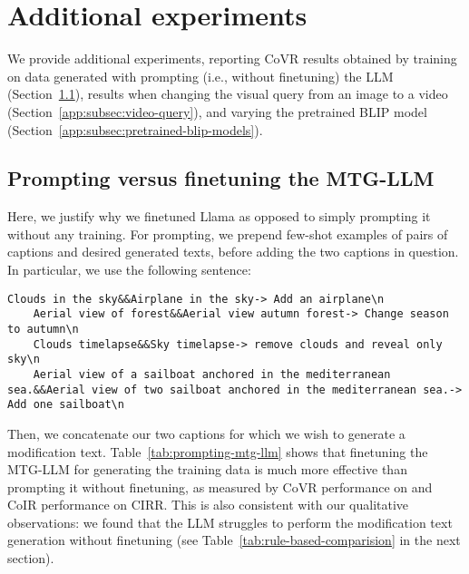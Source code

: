  
\section{Additional experiments}
\label{app:sec:experiments}
We provide additional experiments, reporting CoVR results obtained by training on data 
generated with prompting (i.e., without finetuning) the LLM (Section~\ref{app:subsec:llm}),
results when changing the visual query from an image to a video (Section~\ref{app:subsec:video-query}),
and varying the pretrained BLIP model (Section~\ref{app:subsec:pretrained-blip-models}).

\subsection{Prompting versus finetuning the MTG-LLM}
\label{app:subsec:llm}
Here, we justify why we finetuned Llama as opposed to simply prompting it
without any training. 
For prompting, we prepend few-shot examples of pairs of captions and desired generated texts, before 
adding the two captions in question. 
In particular, we use the following sentence:
\begin{lstlisting}[breaklines, backgroundcolor = \color{backcolour}]
    Clouds in the sky&&Airplane in the sky-> Add an airplane\n
    Aerial view of forest&&Aerial view autumn forest-> Change season to autumn\n
    Clouds timelapse&&Sky timelapse-> remove clouds and reveal only sky\n
    Aerial view of a sailboat anchored in the mediterranean sea.&&Aerial view of two sailboat anchored in the mediterranean sea.-> Add one sailboat\n
\end{lstlisting}
Then, we concatenate our two captions for which we wish to generate a modification text.
Table~\ref{tab:prompting-mtg-llm} shows that finetuning the MTG-LLM for generating the training data is much more effective than prompting it without finetuning, as measured by CoVR performance on \ourDSm and CoIR performance on CIRR. 
This is also consistent with our qualitative observations: we found that the LLM struggles to perform the modification text generation without finetuning (see Table~\ref{tab:rule-based-comparision} in the next section).


